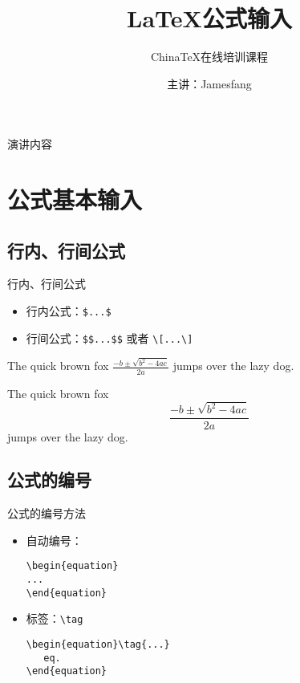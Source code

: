 \documentclass[t]{beamer}
\begin{document}
\fontsize{14pt}{.9\baselineskip}\selectfont

  \title{\LaTeX{}公式输入
}
\date{主讲：Jamesfang
}
\author{China\TeX{}在线培训课程}

  \begin{frame}
    \maketitle
  \end{frame}

\begin{frame}{演讲内容}
\begin{multicols}{2}
\tableofcontents
\end{multicols}
\end{frame}

\section{公式基本输入}

\subsection{行内、行间公式}
\begin{frame}[fragile]{行内、行间公式}
\begin{itemize}
\item 行内公式：\verb"$...$"
\item 行间公式：\verb"$$...$$" 或者 \verb"\[...\]"
\end{itemize}

The quick brown fox $\frac{-b\pm\sqrt{b^2-4ac}}{2a}$  jumps over the lazy dog.

The quick brown fox $$\frac{-b\pm\sqrt{b^2-4ac}}{2a}$$  jumps over the lazy dog.
\end{frame}

\subsection{公式的编号}
\begin{frame}[fragile]{公式的编号方法}
\begin{itemize}
\item 自动编号：
\begin{verbatim}
\begin{equation}
...
\end{equation}
\end{verbatim}
\item 标签：\verb"\tag"
\begin{verbatim}
\begin{equation}\tag{...}
   eq.
\end{equation}
\end{verbatim}
\end{itemize}
\end{frame}
\end{document}
